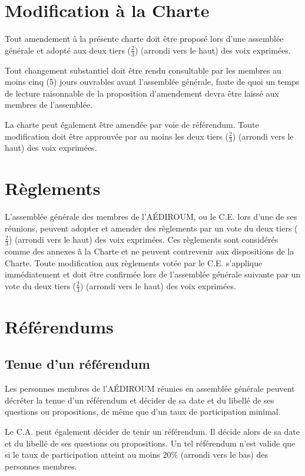 \documentclass{aediroum}
\begin{document}
\section{Modification à la Charte}\label{sec:modification-a-la-charte}

Tout amendement à la présente charte doit être proposé lors d'une assemblée générale et adopté aux deux tiers (\( \frac{2}{3} \)) (arrondi vers le haut) des voix exprimées.

Tout changement substantiel doit être rendu consultable par les membres au moins
cinq (5) jours ouvrables avant l’assemblée générale, faute de quoi un temps de lecture
raisonnable de la proposition d’amendement devra être laissé aux membres de l’assemblée.

La charte peut également être amendée par voie de référendum. Toute modification doit être approuvée par au moins les deux tiers (\( \frac{2}{3} \)) (arrondi vers le haut) des voix exprimées.

\section{Règlements}
\label{sec:reglements}
L’assemblée générale des membres de l’AÉDIROUM, ou le C.E. lors d’une de ses réunions, peuvent adopter et amender des règlements par un vote du deux tiers (\( \frac{2}{3} \)) (arrondi vers le haut) des voix exprimées. Ces règlements sont considérés comme des annexes à la Charte et ne peuvent contrevenir aux dispositions de la Charte. Toute modification aux règlements votée par le C.E. s’applique immédiatement et doit être confirmée lors de l’assemblée générale suivante par un vote du deux tiers (\( \frac{2}{3} \)) (arrondi vers le haut) des voix exprimées.

\section{Référendums}\label{sec:referendums}
\subsection{Tenue d'un référendum}\label{sec:tenue-dun-referendum}
Les personnes membres de l'AÉDIROUM réunies en assemblée générale peuvent décréter la tenue d'un référendum et décider de sa date et du libellé de ses questions ou propositions, de même que d'un taux de participation minimal.

Le C.A. peut également décider de tenir un référendum. Il décide alors de sa date et du libellé de ses questions ou propositions. Un tel référendum n'est valide que si le taux de participation atteint au moins 20\% (arrondi vers le bas) des personnes membres.
\end{document}
